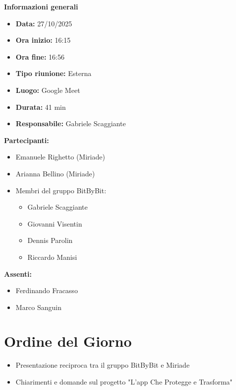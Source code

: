 \documentclass[a4paper,12pt]{article}
\begin{document}
\clearpage
{\large \textbf{Informazioni generali}}
{\footnotesize
{}

\begin{itemize}
    \item \textbf{Data:} 27/10/2025
    \item \textbf{Ora inizio:} 16:15
    \item \textbf{Ora fine:} 16:56
    \item \textbf{Tipo riunione:} Esterna
    \item \textbf{Luogo:} Google Meet
    \item \textbf{Durata:} 41 min
    \item \textbf{Responsabile:} Gabriele Scaggiante
\end{itemize}

\vspace{0.2cm}

\textbf{Partecipanti:}
\begin{itemize}
    \item Emanuele Righetto (Miriade)
    \item Arianna Bellino (Miriade)
    \item Membri del gruppo BitByBit:
    \begin{itemize}
        \item Gabriele Scaggiante
        \item Giovanni Visentin
        \item Dennis Parolin 
        \item Riccardo Manisi
    \end{itemize}
\end{itemize}

\textbf{Assenti:}
\begin{itemize}
    \item Ferdinando Fracasso
    \item Marco Sanguin
\end{itemize}
}

\vspace{0.5cm}

\vspace{0.8cm}

\clearpage
\tableofcontents
\thispagestyle{empty} %
\clearpage

\section{Ordine del Giorno}
\begin{itemize}
    \item Presentazione reciproca tra il gruppo BitByBit e Miriade
    \item Chiarimenti e domande sul progetto "L'app Che Protegge e Trasforma"
\end{itemize}
\end{document}
